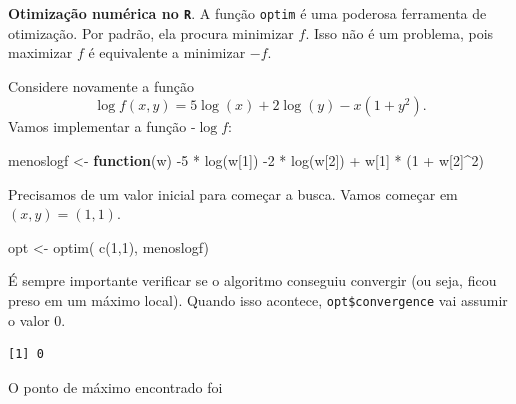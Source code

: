 \documentclass[
  letterpaper,
  DIV=11,
  numbers=noendperiod]{scrartcl}
\newenvironment{Shaded}{\begin{snugshade}}{\end{snugshade}}
\newcommand{\ControlFlowTok}[1]{\textcolor[rgb]{0.00,0.23,0.31}{\textbf{#1}}}
\newcommand{\DecValTok}[1]{\textcolor[rgb]{0.68,0.00,0.00}{#1}}
\newcommand{\FunctionTok}[1]{\textcolor[rgb]{0.28,0.35,0.67}{#1}}
\newcommand{\NormalTok}[1]{\textcolor[rgb]{0.00,0.23,0.31}{#1}}
\newcommand{\OtherTok}[1]{\textcolor[rgb]{0.00,0.23,0.31}{#1}}
\newcommand{\SpecialCharTok}[1]{\textcolor[rgb]{0.37,0.37,0.37}{#1}}
\begin{document}
\textbf{Otimização numérica no \texttt{R}}. A função \texttt{optim} é
uma poderosa ferramenta de otimização. Por padrão, ela procura minimizar
\(f\). Isso não é um problema, pois maximizar \(f\) é equivalente a
minimizar \(-f\).

Considere novamente a função \[\log f(x,y)=5\log(x)+2\log(y)-x(1+y^2).\]
Vamos implementar a função -\(\log f\):

\begin{Shaded}
\begin{Highlighting}[]
\NormalTok{menoslogf }\OtherTok{\textless{}{-}} \ControlFlowTok{function}\NormalTok{(w) }\SpecialCharTok{{-}}\DecValTok{5} \SpecialCharTok{*} \FunctionTok{log}\NormalTok{(w[}\DecValTok{1}\NormalTok{]) }\SpecialCharTok{{-}}\DecValTok{2} \SpecialCharTok{*} \FunctionTok{log}\NormalTok{(w[}\DecValTok{2}\NormalTok{]) }\SpecialCharTok{+}\NormalTok{ w[}\DecValTok{1}\NormalTok{] }\SpecialCharTok{*}\NormalTok{ (}\DecValTok{1} \SpecialCharTok{+}\NormalTok{ w[}\DecValTok{2}\NormalTok{]}\SpecialCharTok{\^{}}\DecValTok{2}\NormalTok{)}
\end{Highlighting}
\end{Shaded}

Precisamos de um valor inicial para começar a busca. Vamos começar em
\((x,y)=(1,1)\).

\begin{Shaded}
\begin{Highlighting}[]
\NormalTok{opt }\OtherTok{\textless{}{-}} \FunctionTok{optim}\NormalTok{( }\FunctionTok{c}\NormalTok{(}\DecValTok{1}\NormalTok{,}\DecValTok{1}\NormalTok{), menoslogf)}
\end{Highlighting}
\end{Shaded}

É sempre importante verificar se o algoritmo conseguiu convergir (ou
seja, ficou preso em um máximo local). Quando isso acontece,
\texttt{opt\$convergence} vai assumir o valor 0.

\begin{Shaded}
\end{Shaded}

\begin{verbatim}
[1] 0
\end{verbatim}

O ponto de máximo encontrado foi

\begin{Shaded}
\end{Shaded}
\end{document}
